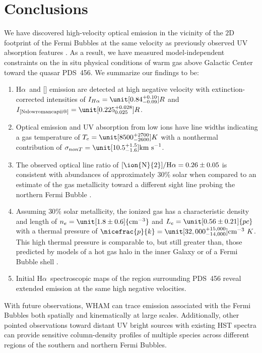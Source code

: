 \documentclass[twocolumn]{aastex63}
\makeatletter
\newcommand{\nii}{\ion{N}{2}}
\newcommand{\ha}{H\ensuremath{\alpha}}
\newcommand{\kms}{\mathrm{km~s}\ensuremath{^{-1}}}
\newcommand*{\rom}[1]{\expandafter\@slowromancap\romannumeral #1@}
\makeatother
\begin{document}
\section{Conclusions} \label{sec:conc}
We have discovered high-velocity optical emission in the vicinity of the $2$D footprint of the Fermi Bubbles at the same velocity as previously observed UV absorption features 
\citep{Fox2015}. As a result, we have measured model-independent constraints on the in situ physical conditions of warm gas above Galactic Center toward the quasar PDS~456. We summarize our findings to be: 
\begin{enumerate}[itemsep=0mm,leftmargin=*]
    \item \ha\ and [\nii] emission are detected at high negative velocity with extinction-corrected intensities of $I_{\ha} = \unit[0.84^{+0.10}_{-0.09}]{R}$ and $I_{\left[\textrm{N\rom{2}}\right]} = \unit[0.225^{+0.028}_{0.025}]{R}$.
    \item Optical emission and UV absorption from low ions have line widths indicating a gas temperature of $T_e = \unit[8500^{+2700}_{-2600}]{K}$ with a nonthermal contribution of $\sigma_{nonT} = \unit[10.5^{+1.5}_{-1.6}]{\kms}$.
    \item The observed optical line ratio of $\textrm{[\nii]/\ha} = 0.26 \pm 0.05$ is consistent with abundances of approximately $30\%$ solar when compared to an estimate of the gas metallicity toward a different sight line probing the northern Fermi Bubble \citep{Bordoloi2017}. 
    \item Assuming $30\%$ solar metallicity, the ionized gas has a characteristic density and length of $n_{e} = \unit[1.8 \pm 0.6]{\textrm{cm}^{-3}}$ and $L_{e} = \unit[0.56 \pm 0.21]{pc}$ with a thermal pressure of $\nicefrac{p}{k} = \unit[32,000^{+15,000}_{-14,000}]{\textrm{cm}^{-3}~K}$. This high thermal pressure is comparable to, but still greater than, those predicted by models of a hot gas halo in the inner Galaxy or of a Fermi Bubble shell \citep{Miller2015,Miller2016}. 
    \item Initial \ha\ spectroscopic maps of the region surrounding PDS~456 reveal extended emission at the same high negative velocities. 
\end{enumerate}

With future observations, WHAM can trace emission associated with the Fermi Bubbles both spatially and kinematically at large scales. Additionally, other pointed observations toward distant UV bright sources with existing HST spectra can provide sensitive column-density profiles of multiple species across different regions of the southern and northern Fermi Bubbles. 
\end{document}
